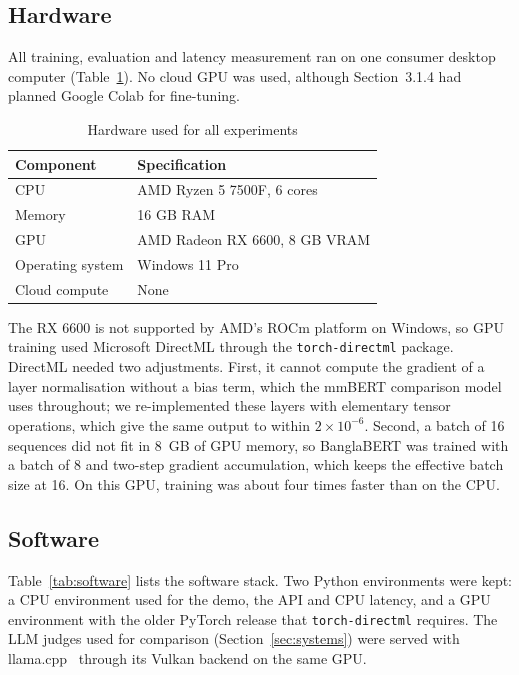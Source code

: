 \subsection{Hardware}

All training, evaluation and latency measurement ran on one consumer desktop
computer (Table~\ref{tab:hardware}). No cloud GPU was used, although
Section~3.1.4 had planned Google Colab for fine-tuning.

\begin{table}[htbp]
\centering
\caption{Hardware used for all experiments}
\label{tab:hardware}
\begin{tabular}{ll}
\hline
\textbf{Component} & \textbf{Specification} \\
\hline
CPU & AMD Ryzen 5 7500F, 6 cores \\
Memory & 16 GB RAM \\
GPU & AMD Radeon RX 6600, 8 GB VRAM \\
Operating system & Windows 11 Pro \\
Cloud compute & None \\
\hline
\end{tabular}
\end{table}

The RX 6600 is not supported by AMD's ROCm platform on Windows, so GPU training
used Microsoft DirectML through the \texttt{torch-directml} package. DirectML
needed two adjustments. First, it cannot compute the gradient of a layer
normalisation without a bias term, which the mmBERT comparison model uses
throughout; we re-implemented these layers with elementary tensor operations,
which give the same output to within $2\times10^{-6}$. Second, a batch of 16
sequences did not fit in 8~GB of GPU memory, so BanglaBERT was trained with a
batch of 8 and two-step gradient accumulation, which keeps the effective batch
size at 16. On this GPU, training was about four times faster than on the CPU.

\subsection{Software}

Table~\ref{tab:software} lists the software stack. Two Python environments were
kept: a CPU environment used for the demo, the API and CPU latency, and a GPU
environment with the older PyTorch release that \texttt{torch-directml}
requires. The LLM judges used for comparison (Section~\ref{sec:systems}) were
served with llama.cpp~\cite{llamacpp} through its Vulkan backend on the same GPU.

